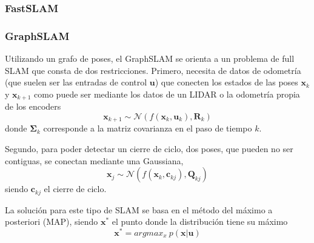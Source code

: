 \subsubsection{FastSLAM}


\subsubsection{GraphSLAM}
Utilizando un grafo de poses, el GraphSLAM se orienta a un problema de full SLAM que consta de dos restricciones. Primero, necesita de datos de odometría (que suelen ser las entradas de control $\bm{u}$) que conecten los estados de las poses $\bm{x}_k$ y $\bm{x}_{k+1}$ como puede ser mediante los datos de un LIDAR o la odometría propia de los encoders
\begin{equation}
    \bm{x}_{k+1} \sim \mathcal{N}(f(\bm{x}_{k},\bm{u}_k),\bm{R}_k)
\end{equation}
donde $\bm{\Sigma}_k$ corresponde a la matriz covarianza en el paso de tiempo $k$.

Segundo, para poder detectar un cierre de ciclo, dos poses, que pueden no ser contiguas, se conectan mediante una Gaussiana,
\begin{equation}
    \bm{x}_j \sim \mathcal{N}(f(\bm{x}_k,\bm{c}_{kj}), \bm{Q}_{kj})
\end{equation}
siendo $\bm{c}_{kj}$ el cierre de ciclo.

La solución para este tipo de SLAM se basa en el método del máximo a posteriori (MAP), siendo $\bm{x}^*$ el punto donde la distribución tiene su máximo
\begin{equation}
    \bm{x}^* = argmax_x\ p(\bm{x}|\bm{u})
\end{equation}

